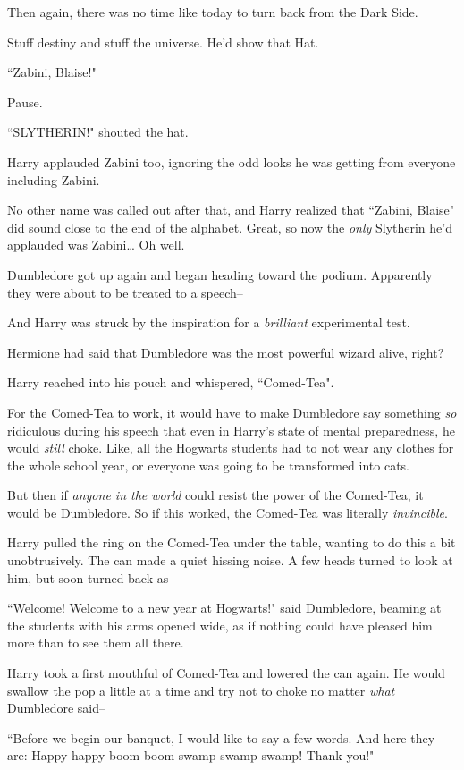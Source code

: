 Then again, there was no time like today to turn back from the Dark Side.

Stuff destiny and stuff the universe. He'd show that Hat.

``Zabini, Blaise!"

Pause.

``SLYTHERIN!" shouted the hat.

Harry applauded Zabini too, ignoring the odd looks he was getting from everyone including Zabini.

No other name was called out after that, and Harry realized that ``Zabini, Blaise" did sound close to the end of the alphabet. Great, so now the \emph{only} Slytherin he'd applauded was Zabini{\ldots} Oh well.

Dumbledore got up again and began heading toward the podium. Apparently they were about to be treated to a speech\---

And Harry was struck by the inspiration for a \emph{brilliant} experimental test.

Hermione had said that Dumbledore was the most powerful wizard alive, right?

Harry reached into his pouch and whispered, ``Comed-Tea".

For the Comed-Tea to work, it would have to make Dumbledore say something \emph{so} ridiculous during his speech that even in Harry's state of mental preparedness, he would \emph{still} choke. Like, all the Hogwarts students had to not wear any clothes for the whole school year, or everyone was going to be transformed into cats.

But then if \emph{anyone in the world} could resist the power of the Comed-Tea, it would be Dumbledore. So if this worked, the Comed-Tea was literally \emph{invincible}.

Harry pulled the ring on the Comed-Tea under the table, wanting to do this a bit unobtrusively. The can made a quiet hissing noise. A few heads turned to look at him, but soon turned back as\---

``Welcome! Welcome to a new year at Hogwarts!" said Dumbledore, beaming at the students with his arms opened wide, as if nothing could have pleased him more than to see them all there.

Harry took a first mouthful of Comed-Tea and lowered the can again. He would swallow the pop a little at a time and try not to choke no matter \emph{what} Dumbledore said\---

``Before we begin our banquet, I would like to say a few words. And here they are: Happy happy boom boom swamp swamp swamp! Thank you!"

